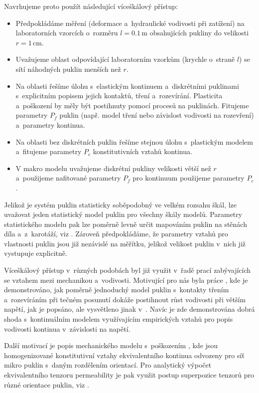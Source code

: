 \documentclass{article}
\def\unit#1{\mathrm{#1}}
\begin{document}
Navrhujeme proto použít následující víceškálový přístup:
\begin{itemize}
 \item Předpokládáme měření (deformace a~hydraulické vodivosti při zatížení) na laboratorních vzorcích o~rozměru $l=0.1\,\unit{m}$ obsahujících pukliny do velikosti $r=1\,\unit{cm}$.
 \item Uvažujeme oblast odpovídající laboratorním vzorkům (krychle o~straně $l$) se sítí náhodných puklin menších než $r$.
 \item Na oblasti řešíme úlohu s~elastickým kontinuem a~diskrétními puklinami s~explicitním popisem jejich kontaktů, tření a~rozevírání.
       Plasticita a~poškození by měly být postihnuty pomocí procesů na puklinách. Fitujeme parametry $P_f$ puklin (např. model tření nebo závislost vodivosti na rozevření) a~parametry kontinua. 
 \item Na oblasti bez diskrétních puklin řešíme stejnou úlohu s~plastickým modelem a~fitujeme parametry $P_c$ konstitutivních vztahů kontinua.
 \item V makro modelu uvažujeme diskrétní pukliny velikosti větší než $r$ a~použijeme nafitované parametry $P_f$ pro kontinuum použijeme parametry $P_c$.
\end{itemize}
Jelikož je systém puklin statisticky soběpodobný ve velkém rozsahu škál, lze uvažovat jeden statistický model puklin pro všechny škály modelů.
Parametry statistického modelu pak lze poměrně levně určit mapováním puklin na stěnách díla a~z~karotáží, viz \cite{Bonnet2001}.
Zároveň předpokládáme, že parametry vztahů pro vlastnosti puklin jsou již nezávislé na měřítku, 
jelikož velikost puklin v~nich již vystupuje explicitně. 

Víceškálový přístup v~různých podobách byl již využit v~řadě prací zabývajících se vztahem mezi mechanikou a~vodivosti. 
Motivující pro nás byla práce \cite{Min2004a}, kde je demonstrováno, jak poměrně jednoduchý model puklin
s~kontakty třením a~rozevíráním při tečném posunutí
dokáže postihnout růst vodivosti při větším napětí, jak je popsáno, ale vysvětleno jinak v~\cite{Souley2001}.
Navíc je zde demonstrována dobrá shoda s~kontinuálním modelem využívajícím empirických vztahů pro popis vodivosti kontinua v~závislosti na napětí.

Další motivací je popis mechanického modelu s~poškozením \cite{Shao2005}, kde jsou homogenizované konstitutivní vztahy ekvivalentního kontinua
odvozeny pro síť mikro puklin s~daným rozdělením orientací. Pro analytický výpočet ekvivalentního tenzoru permeability je pak využit postup superpozice tenzorů 
pro různé orientace puklin, viz \cite{Oda1986a}.
\end{document}
